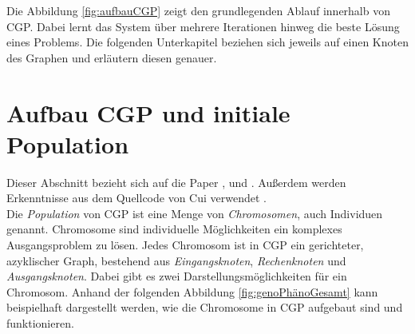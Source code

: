 Die Abbildung \ref{fig:aufbauCGP} zeigt den grundlegenden Ablauf innerhalb von CGP.
Dabei lernt das System über mehrere Iterationen hinweg die beste Lösung eines Problems.
Die folgenden Unterkapitel beziehen sich jeweils auf einen Knoten des Graphen und erläutern diesen genauer.


\section{Aufbau CGP und initiale Population}
\label{sec:initialePopulation}
Dieser Abschnitt bezieht sich auf die Paper \cite{miller_cartesian_2020}, \cite{torabi_using_2022} und \cite{milad_taleby_ahvanooey_survey_2019}.
Außerdem werden Erkenntnisse aus dem Quellcode von Cui verwendet \cite{cuihen_cuihencgp_with_crossover_strategies_2024}.\\
Die \emph{Population} von CGP ist eine Menge von \emph{Chromosomen}, auch Individuen genannt.
Chromosome sind individuelle Möglichkeiten ein komplexes Ausgangsproblem zu lösen.
Jedes Chromosom ist in CGP ein gerichteter, azyklischer Graph, bestehend aus \emph{Eingangsknoten}, \emph{Rechenknoten} und \emph{Ausgangsknoten}.
Dabei gibt es zwei Darstellungsmöglichkeiten für ein Chromosom. 
Anhand der folgenden Abbildung \ref{fig:genoPhänoGesamt} kann beispielhaft dargestellt werden, wie die Chromosome in CGP aufgebaut sind und funktionieren.

